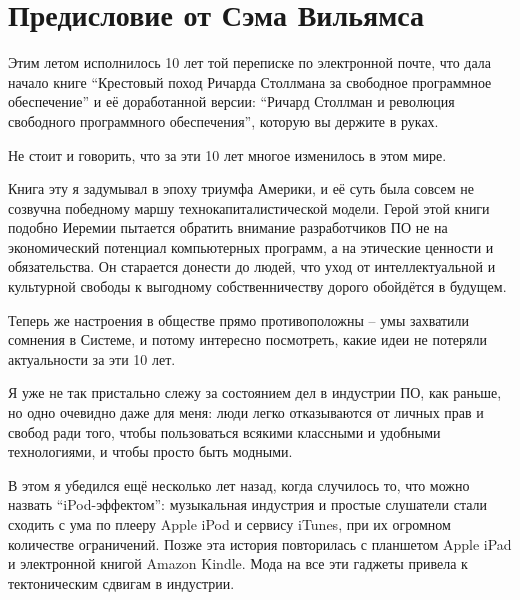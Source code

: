 
\chapter{Предисловие от Сэма Вильямса}

Этим летом исполнилось 10 лет той переписке по электронной почте,
что дала начало книге \enquote{Крестовый
поход Ричарда Столлмана за свободное программное обеспечение} и её
доработанной версии: \enquote{Ричард Столлман и революция свободного
программного обеспечения}, которую вы держите в руках.

Не стоит и говорить, что за эти 10 лет многое изменилось в этом мире.

Книга эту я задумывал в эпоху триумфа Америки, и её суть была совсем
не созвучна победному маршу технокапиталистической модели.
Герой этой книги подобно Иеремии пытается обратить внимание
разработчиков ПО не на экономический потенциал компьютерных
программ, а на этические ценности и обязательства. Он старается донести
до людей, что уход от интеллектуальной и культурной свободы к
выгодному собственничеству дорого обойдётся в будущем.

Теперь же настроения в обществе прямо противоположны -- умы
захватили сомнения в Системе, и потому интересно посмотреть,
какие идеи не потеряли актуальности за эти 10 лет.

Я уже не так пристально слежу за состоянием дел в индустрии ПО,
как раньше, но одно очевидно даже для меня: люди легко отказываются
от личных прав и свобод ради того, чтобы пользоваться всякими
классными и удобными технологиями, и чтобы просто быть модными.

В этом я убедился ещё несколько лет назад, когда случилось то, что
можно назвать \enquote{iPod-эффектом}: музыкальная индустрия и простые
слушатели стали сходить с ума по плееру Apple iPod и сервису iTunes,
при их огромном количестве ограничений. Позже эта история повторилась
с планшетом Apple iPad и электронной книгой Amazon Kindle. Мода на
все эти гаджеты привела к тектоническим сдвигам в индустрии.


